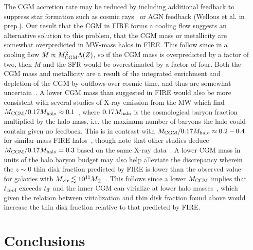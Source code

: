 \documentclass[fleqn,usenatbib]{mnras}
\newcommand{\Mdot}{\dot{M}}
\begin{document}
The CGM accretion rate may be reduced by including additional feedback to suppress star formation such as cosmic rays~\citep{Chan2019, Hopkins2020, Hopkins2020a, Hopkins2020b}
or AGN feedback (Wellons et al. in prep.). 
Our result that the CGM in FIRE forms a cooling flow suggests an alternative solution to this problem, that the CGM mass or metallicity are somewhat overpredicted in MW-mass halos in FIRE.
This follow since in a cooling flow $\Mdot\propto M_{\rm CGM}^2 \Lambda(Z)$, so if the CGM mass is overpredicted by a factor of two, then $\Mdot$ and the SFR would be overestimated by a factor of four.
Both the CGM mass and metallicity are a result of the integrated enrichment and depletion of the CGM by outflows over cosmic time, and thus are somewhat uncertain~\citep{Kelly2021}.
A lower CGM mass than suggested in FIRE would also be more consistent with several studies of X-ray emission from the MW which find $M_{\rm CGM}/0.17M_{\rm halo} \approx 0.1$~\citep[][]{Faerman2017, Li2018, Bregman2018}, where $0.17 M_{\rm halo}$ is the cosmological baryon fraction multiplied by the halo mass, i.e. the maximum number of baryons the halo could contain given no feedback.
This is in contrast with $M_{\rm CGM}/0.17M_{\rm halo} \approx 0.2-0.4$ for similar-mass FIRE halos~\citep{Hafen2019}, though note that other studies deduce $M_{\rm CGM}/0.17M_{\rm halo}=0.3$ based on the same X-ray data~\citep{Faerman2019}.
A lower CGM mass in units of the halo baryon budget may also help alleviate the discrepancy wherein the $z\sim0$ thin disk fraction predicted by FIRE is lower than the observed value for galaxies with $M_{\rm vir} \lesssim 10^{11} M_\odot$~\citep{El-Badry2018, Peebles2020, Stern2020}.
This follows since a lower $M_{\rm CGM}$ implies that $t_{\rm cool}$ exceeds $t_{\rm ff}$ and the inner CGM can virialize at lower halo masses~\citep{Stern2020}, which given the relation between virialization and thin disk fraction found above would increase the thin disk fraction relative to that predicted by FIRE. 

\section{Conclusions}
\label{s: conclusions}
\end{document}
